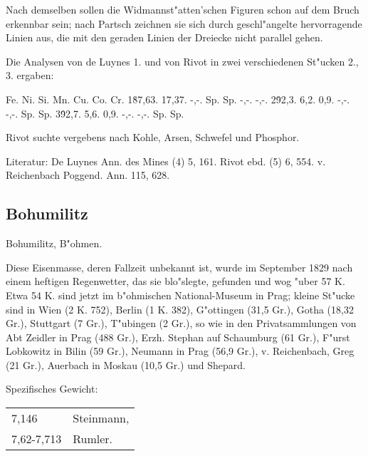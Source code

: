 \documentclass[a4paper, 11pt, oneside]{article}
\begin{document}
Nach demselben sollen die Widmannst"atten'schen Figuren schon auf dem Bruch erkennbar sein; nach Partsch zeichnen sie sich durch geschl"angelte hervorragende Linien aus, die mit den geraden Linien der Dreiecke nicht parallel gehen.

Die Analysen von de Luynes 1. und von Rivot in zwei verschiedenen St"ucken 2., 3. ergaben:

Fe. Ni. Si. Mn. Cu. Co. Cr.  
1\. 87,63. 17,37. -,-. Sp. Sp. -,-. -,-.  
2\. 92,3. 6,2. 0,9. -,-. -,-. Sp. Sp.  
3\. 92,7. 5,6. 0,9. -,-. -,-. Sp. Sp.

Rivot suchte vergebens nach Kohle, Arsen, Schwefel und Phosphor.

Literatur: De Luynes Ann. des Mines (4) 5, 161. Rivot ebd. (5) 6, 554. v. Reichenbach Poggend. Ann. 115, 628.

\subsection{Bohumilitz}

Bohumilitz, B"ohmen.

Diese Eisenmasse, deren Fallzeit unbekannt ist, wurde im September 1829 nach einem heftigen Regenwetter, das sie blo"slegte, gefunden und wog "uber 57 K. Etwa 54 K. sind jetzt im b"ohmischen National-Museum in Prag; kleine St"ucke sind in Wien (2 K. 752), Berlin (1 K. 382), G"ottingen (31,5 Gr.), Gotha (18,32 Gr.), Stuttgart (7 Gr.), T"ubingen (2 Gr.), so wie in den Privatsammlungen von Abt Zeidler in Prag (488 Gr.), Erzh. Stephan auf Schaumburg (61 Gr.), F"urst Lobkowitz in Bilin (59 Gr.), Neumann in Prag (56,9 Gr.), v. Reichenbach, Greg (21 Gr.), Auerbach in Moskau (10,5 Gr.) und Shepard.

Spezifisches Gewicht:  
\begin{table}[!ht]
    \centering
    \begin{tabular}{l l}
        7,146 & Steinmann,\\
        7,62-7,713 & Rumler.
    \end{tabular}
\end{table}
\end{document}
